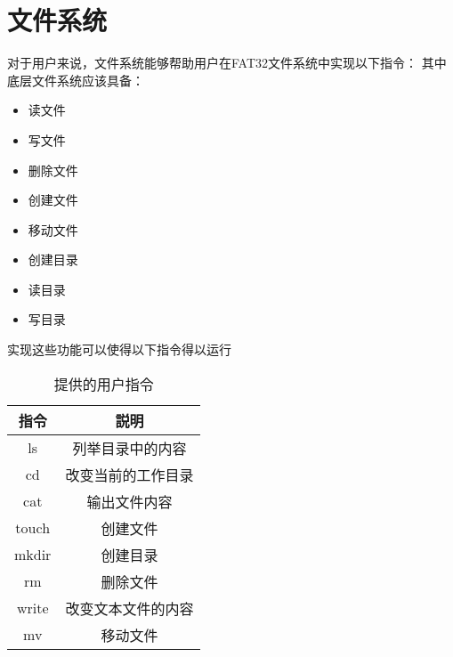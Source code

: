 \section{文件系统}

对于用户来说，文件系统能够帮助用户在FAT32文件系统中实现以下指令：
其中底层文件系统应该具备：

\begin{itemize}
\item 读文件
\item 写文件
\item 删除文件
\item 创建文件
\item 移动文件
\item 创建目录
\item 读目录
\item 写目录
\end{itemize}

实现这些功能可以使得以下指令得以运行

\begin{table}[H]
  \centering
  \caption{提供的用户指令}
  \begin{tabular}{|c|c|}
  \hline
  指令 & 説明 \\
  \hline
  ls & 列举目录中的内容 \\
  \hline
  cd & 改变当前的工作目录 \\
  \hline
  cat & 输出文件内容 \\
  \hline
  touch & 创建文件 \\
  \hline
  mkdir & 创建目录 \\
  \hline
  rm & 删除文件 \\
  \hline
  write & 改变文本文件的内容 \\
  \hline
  mv & 移动文件 \\
  \hline
  \end{tabular}
\end{table}

